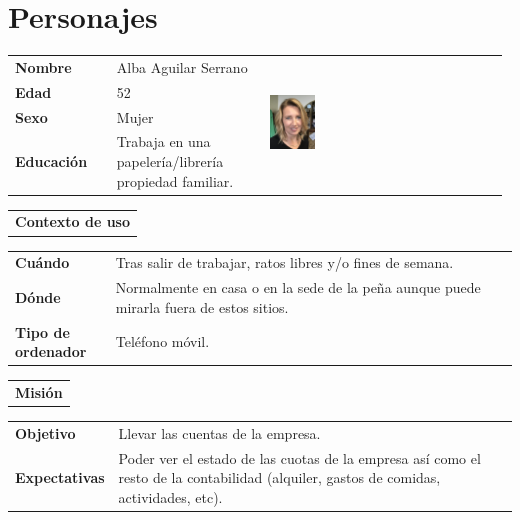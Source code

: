\documentclass[11pt]{article}
\begin{document}
\section{Personajes}
\begin{table}[H]
	\centering
	\begin{tabular}{p{0.2\linewidth}|p{0.3\linewidth}p{0.475\linewidth}}
		\toprule
		\textbf{Nombre} & Alba Aguilar Serrano &\multirow{4}{*}{\begin{minipage}{1.\textwidth}\includegraphics[width=0.2\textwidth, height=30mm]{Alba}\end{minipage}}\\
		\textbf{Edad} & 52 & \\
		\textbf{Sexo} & Mujer & \\
		\textbf{Educación} & Trabaja en una papelería/librería propiedad familiar.  & \\
		\bottomrule
	\end{tabular}
	
	\begin{tabular}{l}
		\textbf{Contexto de uso} 
	\end{tabular}
	
	\begin{tabular}{p{0.2\linewidth}|p{0.8\linewidth}}
		\toprule
		\textbf{Cuándo} & Tras salir de trabajar, ratos libres y/o fines de semana.\\
		\textbf{Dónde}  & Normalmente en casa o en la sede de la peña aunque puede mirarla fuera de estos sitios.\\
		\textbf{Tipo de ordenador} & Teléfono móvil.\\
		\bottomrule
	\end{tabular}
	
	\begin{tabular}{l}
		\textbf{Misión} 
	\end{tabular}
	
	\begin{tabular}{p{0.2\linewidth}|p{0.8\linewidth}}
		\toprule
		\textbf{Objetivo} & Llevar las cuentas de la empresa.
		\\
		\textbf{Expectativas}  & Poder ver el estado de las cuotas de la empresa así como el resto de la contabilidad (alquiler, gastos de comidas, actividades, etc). \\
		\bottomrule
	\end{tabular}
	

\end{table}
\end{document}
